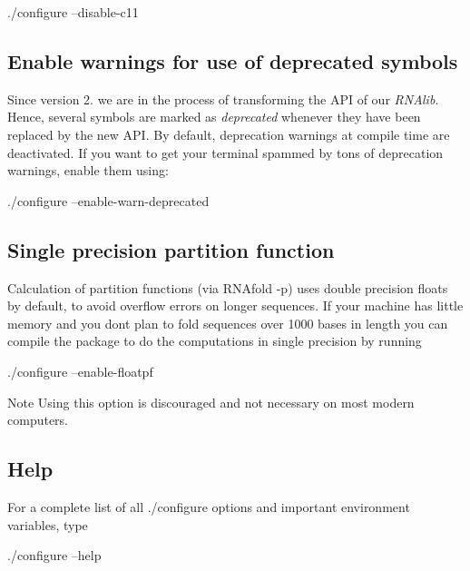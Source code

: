 \begin{DoxyVerb}./configure --disable-c11
\end{DoxyVerb}
\hypertarget{install_config_deprecated}{}\subsection{Enable warnings for use of deprecated symbols}\label{install_config_deprecated}
Since version 2. we are in the process of transforming the A\+PI of our {\itshape R\+N\+Alib}. Hence, several symbols are marked as {\itshape deprecated} whenever they have been replaced by the new A\+PI. By default, deprecation warnings at compile time are deactivated. If you want to get your terminal spammed by tons of deprecation warnings, enable them using\+:

\begin{DoxyVerb}./configure --enable-warn-deprecated
\end{DoxyVerb}
\hypertarget{install_config_float_pf}{}\subsection{Single precision partition function}\label{install_config_float_pf}
Calculation of partition functions (via R\+N\+Afold -\/p) uses double precision floats by default, to avoid overflow errors on longer sequences. If your machine has little memory and you don\textquotesingle{}t plan to fold sequences over 1000 bases in length you can compile the package to do the computations in single precision by running

\begin{DoxyVerb}./configure --enable-floatpf
\end{DoxyVerb}


\begin{DoxyNote}{Note}
Using this option is discouraged and not necessary on most modern computers.
\end{DoxyNote}
\hypertarget{install_config_help}{}\subsection{Help}\label{install_config_help}
For a complete list of all ./configure options and important environment variables, type

\begin{DoxyVerb}./configure --help
\end{DoxyVerb}


